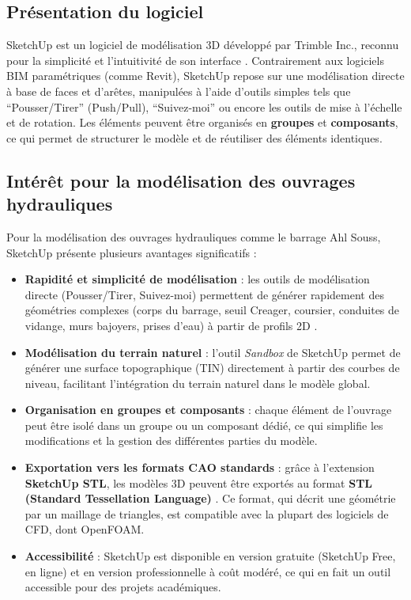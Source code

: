 \subsection{Présentation du logiciel}
\label{subsec:presentation_sketchup}

SketchUp est un logiciel de modélisation 3D développé par Trimble Inc., reconnu pour la simplicité et l'intuitivité de son interface \cite{trimble2023sketchup, brightman2018sketchup}. Contrairement aux logiciels BIM paramétriques (comme Revit), SketchUp repose sur une modélisation directe à base de faces et d'arêtes, manipulées à l'aide d'outils simples tels que ``Pousser/Tirer'' (Push/Pull), ``Suivez-moi'' ou encore les outils de mise à l'échelle et de rotation. Les éléments peuvent être organisés en \textbf{groupes} et \textbf{composants}, ce qui permet de structurer le modèle et de réutiliser des éléments identiques.

\subsection{Intérêt pour la modélisation des ouvrages hydrauliques}
\label{subsec:interet_sketchup}

Pour la modélisation des ouvrages hydrauliques comme le barrage Ahl Souss, SketchUp présente plusieurs avantages significatifs :

\begin{itemize}
    \item \textbf{Rapidité et simplicité de modélisation} : les outils de modélisation directe (Pousser/Tirer, Suivez-moi) permettent de générer rapidement des géométries complexes (corps du barrage, seuil Creager, coursier, conduites de vidange, murs bajoyers, prises d'eau) à partir de profils 2D \cite{brightman2018sketchup}.
    \item \textbf{Modélisation du terrain naturel} : l'outil \textit{Sandbox} de SketchUp permet de générer une surface topographique (TIN) directement à partir des courbes de niveau, facilitant l'intégration du terrain naturel dans le modèle global.
    \item \textbf{Organisation en groupes et composants} : chaque élément de l'ouvrage peut être isolé dans un groupe ou un composant dédié, ce qui simplifie les modifications et la gestion des différentes parties du modèle.
    \item \textbf{Exportation vers les formats CAO standards} : grâce à l'extension \textbf{SketchUp STL}, les modèles 3D peuvent être exportés au format \textbf{STL (Standard Tessellation Language)} \cite{lhuillier2014sketchupstl}. Ce format, qui décrit une géométrie par un maillage de triangles, est compatible avec la plupart des logiciels de CFD, dont OpenFOAM.
    \item \textbf{Accessibilité} : SketchUp est disponible en version gratuite (SketchUp Free, en ligne) et en version professionnelle à coût modéré, ce qui en fait un outil accessible pour des projets académiques.
\end{itemize}

